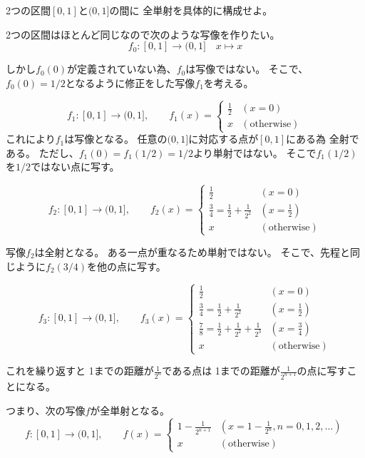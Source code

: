 \documentclass[12pt,b5paper]{ltjsarticle}
\begin{document}
\hrulefill

2つの区間$[0,1]$と$(0,1]$の間に
全単射を具体的に構成せよ。

\dotfill

2つの区間はほとんど同じなので次のような写像を作りたい。
\begin{equation}
 f_0 : [0,1] \to (0,1] \quad x \mapsto x
\end{equation}

しかし$f_0(0)$が定義されていない為、$f_0$は写像ではない。
そこで、$f_0(0)=1/2$となるように修正をした写像$f_1$を考える。

\begin{equation}
 f_1 : [0,1] \to (0,1] ,\qquad
 f_1(x) = 
  \begin{cases}
   \frac{1}{2} & (x = 0)\\
   x & (\text{otherwise})
  \end{cases}
\end{equation}
これにより$f_1$は写像となる。
任意の$(0,1]$に対応する点が$[0,1]$にある為
全射である。
ただし、$f_1(0)=f_1(1/2)=1/2$より単射ではない。
そこで$f_1(1/2)$を$1/2$ではない点に写す。


\begin{equation}
 f_2 : [0,1] \to (0,1] ,\qquad
 f_2(x) = 
  \begin{cases}
   \frac{1}{2} & (x = 0)\\
   \frac{3}{4} = \frac{1}{2}+\frac{1}{2^2} & (x = \frac{1}{2})\\
   x & (\text{otherwise})
  \end{cases}
\end{equation}

写像$f_2$は全射となる。
ある一点が重なるため単射ではない。
そこで、先程と同じように$f_2(3/4)$を他の点に写す。

\begin{equation}
 f_3 : [0,1] \to (0,1] ,\qquad
 f_3(x) = 
  \begin{cases}
   \frac{1}{2} & (x = 0)\\
   \frac{3}{4} = \frac{1}{2}+\frac{1}{2^2} & (x = \frac{1}{2})\\
   \frac{7}{8} = \frac{1}{2}+\frac{1}{2^2}+\frac{1}{2^3} & (x = \frac{3}{4})\\
   x & (\text{otherwise})
  \end{cases}
\end{equation}

これを繰り返すと
1までの距離が$\frac{1}{2^n}$である点は
1までの距離が$\frac{1}{2^{n+1}}$の点に写すことになる。


つまり、次の写像$f$が全単射となる。
\begin{equation}
 f : [0,1] \to (0,1] ,\qquad
 f(x) =
  \begin{cases}
   1-\frac{1}{2^{n+1}} & (x= 1-\frac{1}{2^n}, n=0,1,2,\dots)\\
   x & (\text{otherwise})
  \end{cases}
\end{equation}



\hrulefill


\end{document}
